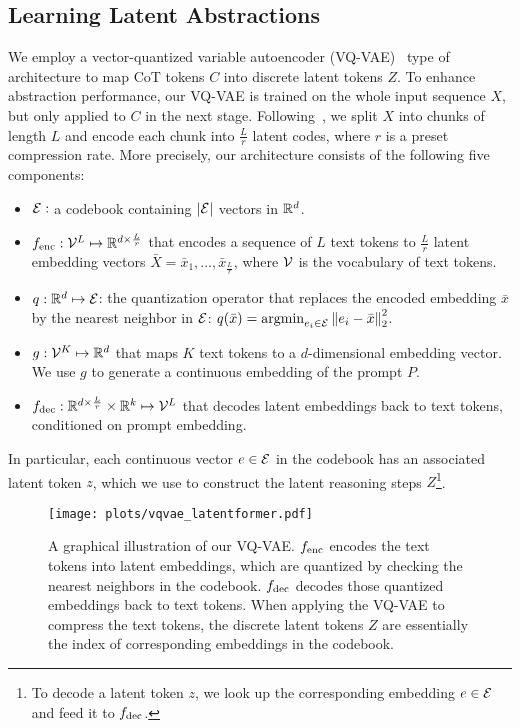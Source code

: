 \subsection{Learning Latent Abstractions}
We employ a vector-quantized variable autoencoder (VQ-VAE)~\cite{van2017neural} type of architecture to map CoT tokens \(C\) into discrete latent tokens \(Z\). %
To enhance abstraction performance, our VQ-VAE is trained on the whole input sequence $X$, but only applied to $C$ in the next stage. Following~\citet{jiang2022efficient, jiang2023h}, we split $X$ into chunks of length \(L\) and encode each chunk into $\frac{L}{r}$ latent codes, where $r$ is a preset compression rate. More precisely, our architecture consists of the following five components:
\vspace{-5pt}
\begin{itemize}\itemsep0pt
    \item ${\mathcal{E}}:$ a codebook containing $|{\mathcal{E}}|$ vectors in ${\mathbb{R}}^d$.
    \item ${f_\text{enc}}: {\mathcal{V}}^L \mapsto {\mathbb{R}}^{d \times \frac{L}{r}} $ that encodes a sequence of $L$ text tokens to $\frac{L}{r}$ latent embedding vectors $\bar{X} = \bar{x}_1, \ldots, \bar{x}_{\frac{L}{r}}$,  where ${\mathcal{V}}$ is the vocabulary of text tokens.
   \item $q: {\mathbb{R}}^{d} \mapsto {\mathcal{E}}$: the quantization operator that replaces the encoded embedding $\bar{x}$ by the nearest neighbor in ${\mathcal{E}}$: $q(\bar{x}) = \operatorname*{argmin}_{e_i \in {\mathcal{E}}} \left\|e_i - \bar{x}\right\|^2_2$.
    \item $g: {\mathcal{V}}^K \mapsto {\mathbb{R}}^d$ that maps $K$ text tokens to a $d$-dimensional embedding vector. We use $g$ to generate a continuous embedding of the prompt $P$.
    \item ${f_\text{dec}}: {\mathbb{R}}^{d \times \frac{L}{r}} \times {\mathbb{R}}^k \mapsto {\mathcal{V}}^L$ that decodes latent embeddings back to text tokens, conditioned on prompt embedding.
\end{itemize}
In particular, each continuous vector $e \in {\mathcal{E}}$ in the codebook has an associated latent token $z$, which we use to construct the latent reasoning steps $Z$\footnote{To decode a latent token $z$, we look up the corresponding embedding $e \in {\mathcal{E}}$ and feed it to ${f_\text{dec}}$.}.


\begin{figure}[t]
    \centering
    \texttt{[image: plots/vqvae\_latentformer.pdf]}
    \caption{A graphical illustration of our VQ-VAE. ${f_\text{enc}}$ encodes the text tokens into latent embeddings, which are quantized by checking the nearest neighbors in the codebook. ${f_\text{dec}}$ decodes those quantized embeddings back to text tokens. When applying the VQ-VAE to compress the text tokens, the discrete latent tokens $Z$ are essentially the index of corresponding embeddings in the codebook.} 
    \label{fig:vqvae}
\end{figure}


